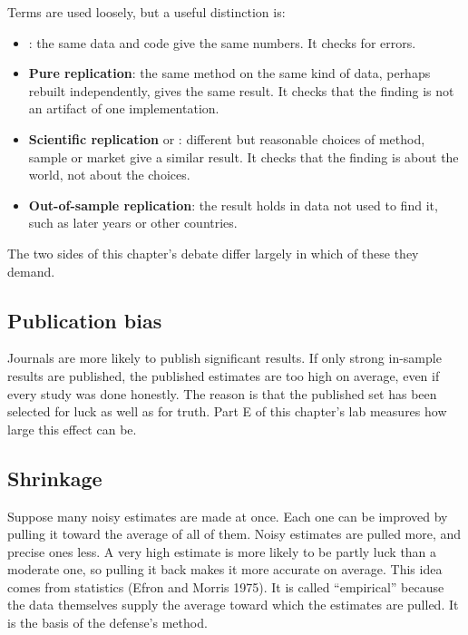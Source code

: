 Terms are used loosely, but a useful distinction is:

\begin{itemize}
  \item {}: the same data and code give the same numbers. It checks for errors.
  \item \textbf{Pure replication}: the same method on the same kind of data, perhaps rebuilt independently, gives the same result. It checks that the finding is not an artifact of one implementation.
  \item \textbf{Scientific replication} or : different but reasonable choices of method, sample or market give a similar result. It checks that the finding is about the world, not about the choices.
  \item \textbf{Out-of-sample replication}: the result holds in data not used to find it, such as later years or other countries.
\end{itemize}

The two sides of this chapter's debate differ largely in which of these they demand.

\subsection{Publication bias}

Journals are more likely to publish significant results. If only strong in-sample results are published, the published estimates are too high on average, even if every study was done honestly. The reason is that the published set has been selected for luck as well as for truth. Part E of this chapter's lab measures how large this effect can be.

\subsection{Shrinkage}

Suppose many noisy estimates are made at once. Each one can be improved by pulling it toward the average of all of them. Noisy estimates are pulled more, and precise ones less. A very high estimate is more likely to be partly luck than a moderate one, so pulling it back makes it more accurate on average. This idea comes from  statistics (Efron and Morris 1975). It is called ``empirical'' because the data themselves supply the average toward which the estimates are pulled. It is the basis of the defense's method.

